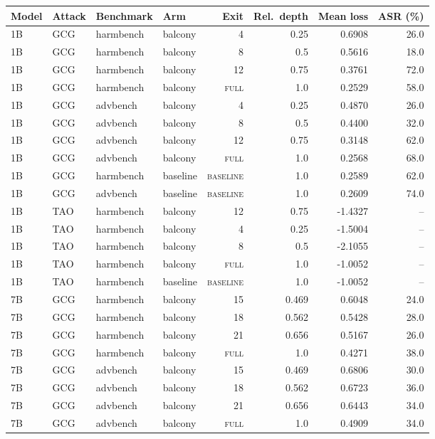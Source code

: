 \begin{tabular}{llllrrrr}
\toprule
Model & Attack & Benchmark & Arm & Exit & Rel.\ depth & Mean loss & ASR (\%) \\
\midrule
1B & GCG & harmbench & balcony & 4 & 0.25 & 0.6908 & 26.0 \\
1B & GCG & harmbench & balcony & 8 & 0.5 & 0.5616 & 18.0 \\
1B & GCG & harmbench & balcony & 12 & 0.75 & 0.3761 & 72.0 \\
1B & GCG & harmbench & balcony & \textsc{full} & 1.0 & 0.2529 & 58.0 \\
1B & GCG & advbench & balcony & 4 & 0.25 & 0.4870 & 26.0 \\
1B & GCG & advbench & balcony & 8 & 0.5 & 0.4400 & 32.0 \\
1B & GCG & advbench & balcony & 12 & 0.75 & 0.3148 & 62.0 \\
1B & GCG & advbench & balcony & \textsc{full} & 1.0 & 0.2568 & 68.0 \\
1B & GCG & harmbench & baseline & \textsc{baseline} & 1.0 & 0.2589 & 62.0 \\
1B & GCG & advbench & baseline & \textsc{baseline} & 1.0 & 0.2609 & 74.0 \\
1B & TAO & harmbench & balcony & 12 & 0.75 & -1.4327 & -- \\
1B & TAO & harmbench & balcony & 4 & 0.25 & -1.5004 & -- \\
1B & TAO & harmbench & balcony & 8 & 0.5 & -2.1055 & -- \\
1B & TAO & harmbench & balcony & \textsc{full} & 1.0 & -1.0052 & -- \\
1B & TAO & harmbench & baseline & \textsc{baseline} & 1.0 & -1.0052 & -- \\
7B & GCG & harmbench & balcony & 15 & 0.469 & 0.6048 & 24.0 \\
7B & GCG & harmbench & balcony & 18 & 0.562 & 0.5428 & 28.0 \\
7B & GCG & harmbench & balcony & 21 & 0.656 & 0.5167 & 26.0 \\
7B & GCG & harmbench & balcony & \textsc{full} & 1.0 & 0.4271 & 38.0 \\
7B & GCG & advbench & balcony & 15 & 0.469 & 0.6806 & 30.0 \\
7B & GCG & advbench & balcony & 18 & 0.562 & 0.6723 & 36.0 \\
7B & GCG & advbench & balcony & 21 & 0.656 & 0.6443 & 34.0 \\
7B & GCG & advbench & balcony & \textsc{full} & 1.0 & 0.4909 & 34.0 \\

\end{tabular}
